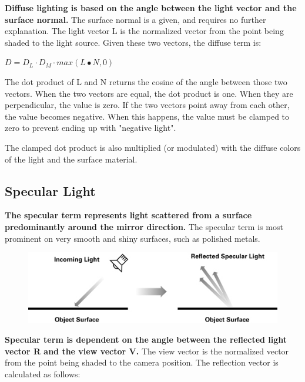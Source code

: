\documentclass{mini}
\begin{document}
{\bf Diffuse lighting is based on the angle between the light vector and the surface normal.} The surface normal is a given, and requires no further explanation. The light vector L is the normalized vector from the point being shaded to the light source. Given these two vectors, the diffuse term is:

\begin{center}
    $ D = D_L \cdot D_M \cdot max(L \bullet N, 0) $
\end{center}

The dot product of L and N returns the cosine of the angle between those two vectors. When the two vectors are equal, the dot product is one. When they are perpendicular, the value is zero. If the two vectors point away from each other, the value becomes negative. When this happens, the value must be clamped to zero to prevent ending up with "negative light".

The clamped dot product is also multiplied (or modulated) with the diffuse colors of the light and the surface material.


\subsection{Specular Light}

{\bf The specular term represents light scattered from a surface predominantly around the mirror direction.} The specular term is most prominent on very smooth and shiny surfaces, such as polished metals.

\begin{figure}[H]
    \centering
    \includegraphics[width=1.0\textwidth]{./images/specular.jpg}
    \caption{}
    \label{fig:specular}
\end{figure}

{\bf Specular term is dependent on the angle between the reflected light vector R and the view vector V.} The view vector is the normalized vector from the point being shaded to the camera position. The reflection vector is calculated as follows:
\end{document}
